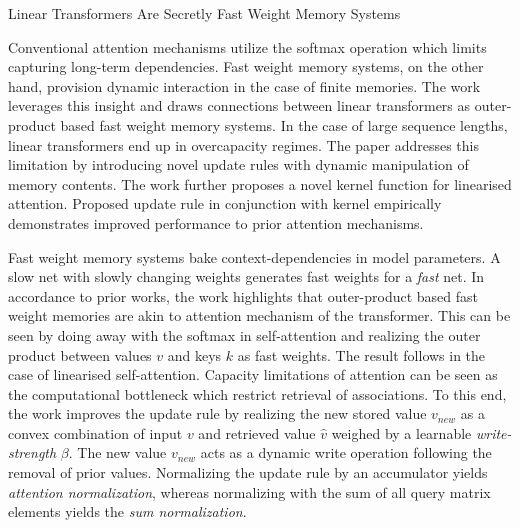 \documentclass[11pt,letterpaper]{article}
\begin{document}
\begin{center}
  \large{Linear Transformers Are Secretly Fast Weight Memory Systems}
\end{center}

Conventional attention mechanisms utilize the softmax operation which limits capturing long-term dependencies. Fast weight memory systems, on the other hand, provision dynamic interaction in the case of finite memories. The work leverages this insight and draws connections between linear transformers as outer-product based fast weight memory systems. In the case of large sequence lengths, linear transformers end up in overcapacity regimes. The paper addresses this limitation by introducing novel update rules with dynamic manipulation of memory contents. The work further proposes a novel kernel function for linearised attention. Proposed update rule in conjunction with kernel empirically demonstrates improved performance to prior attention mechanisms. 

Fast weight memory systems bake context-dependencies in model parameters. A slow net with slowly changing weights generates fast weights for a \textit{fast} net. In accordance to prior works, the work highlights that outer-product based fast weight memories are akin to attention mechanism of the transformer. This can be seen by doing away with the softmax in self-attention and realizing the outer product between values $v$ and keys $k$ as fast weights. The result follows in the case of linearised self-attention. Capacity limitations of attention can be seen as the computational bottleneck which restrict retrieval of associations. To this end, the work improves the update rule by realizing the new stored value $v_{new}$ as a convex combination of input $v$ and retrieved value $\hat{v}$ weighed by a learnable \textit{write-strength} $\beta$. The new value $v_{new}$ acts as a dynamic write operation following the removal of prior values. Normalizing the update rule by an accumulator yields \textit{attention normalization}, whereas normalizing with the sum of all query matrix elements yields the \textit{sum normalization}. 
\end{document}
